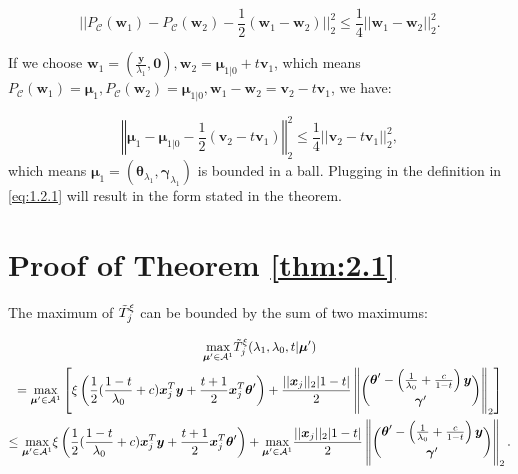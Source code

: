 \begin{equation}
    ||P_{\mathcal{C}}(\boldsymbol w_1)-P_{\mathcal{C}}(\boldsymbol w_2)-\frac{1}{2}(\boldsymbol w_1-\boldsymbol w_2)||_2^2\leq\frac{1}{4}||\boldsymbol w_1-\boldsymbol w_2||_2^2.
\end{equation}

If we choose $\boldsymbol w_1=(\frac{\boldsymbol y}{\lambda_1},\boldsymbol0),\boldsymbol w_2=\boldsymbol\mu_{1|0}+t\boldsymbol v_1$, which means $P_{\mathcal{C}}(\boldsymbol w_1)=\boldsymbol\mu_1,P_{\mathcal{C}}(\boldsymbol w_2)=\boldsymbol\mu_{1|0},\boldsymbol w_1-\boldsymbol w_2=\boldsymbol v_2-t\boldsymbol v_1$, we have:

\begin{equation}
    \left\Vert\boldsymbol\mu_1-\boldsymbol\mu_{1|0}-\frac{1}{2}(\boldsymbol v_2-t\boldsymbol v_1)\right\Vert_2^2\leq\frac{1}{4}||\boldsymbol v_2-t\boldsymbol v_1||_2^2,
\end{equation}
which means $\boldsymbol\mu_1=(\boldsymbol\theta_{\lambda_1},\boldsymbol\gamma_{\lambda_1})$ is bounded in a ball. Plugging in the definition in \eqref{eq:1.2.1} will result in the form stated in the theorem.

\section{Proof of Theorem \ref{thm:2.1}}

The maximum of $\Tilde{T}^\xi_j$ can be bounded by the sum of two maximums:

\begin{equation}
    \begin{gathered}
        \underset{\boldsymbol\mu'\in\mathcal{A}^1}{\mathrm{max}}\Tilde{T}^\xi_j(\lambda_1,\lambda_0,t|\boldsymbol\mu')\\
        =\underset{\boldsymbol\mu'\in\mathcal{A}^1}{\mathrm{max}}\left[\xi\left( \frac{1}{2}(\frac{1-t}{\lambda_0}+c)\boldsymbol x_j^T\boldsymbol y+\frac{t+1}{2}\boldsymbol x_j^T\boldsymbol\theta'\right)+\frac{||\boldsymbol x_j||_2|1-t|}{2}\left\Vert\binom{\boldsymbol\theta'-\left(\frac{1}{\lambda_0}+\frac{c}{1-t}\right)\boldsymbol y}{\boldsymbol\gamma'}\right\Vert_2\right]\\
        \leq \underset{\boldsymbol\mu'\in\mathcal{A}^1}{\mathrm{max}}\xi\left( \frac{1}{2}(\frac{1-t}{\lambda_0}+c)\boldsymbol x_j^T\boldsymbol y+\frac{t+1}{2}\boldsymbol x_j^T\boldsymbol\theta'\right)+\underset{\boldsymbol\mu'\in\mathcal{A}^1}{\mathrm{max}}\frac{||\boldsymbol x_j||_2|1-t|}{2}\left\Vert\binom{\boldsymbol\theta'-\left(\frac{1}{\lambda_0}+\frac{c}{1-t}\right)\boldsymbol y}{\boldsymbol\gamma'}\right\Vert_2.
    \end{gathered}
\end{equation}

